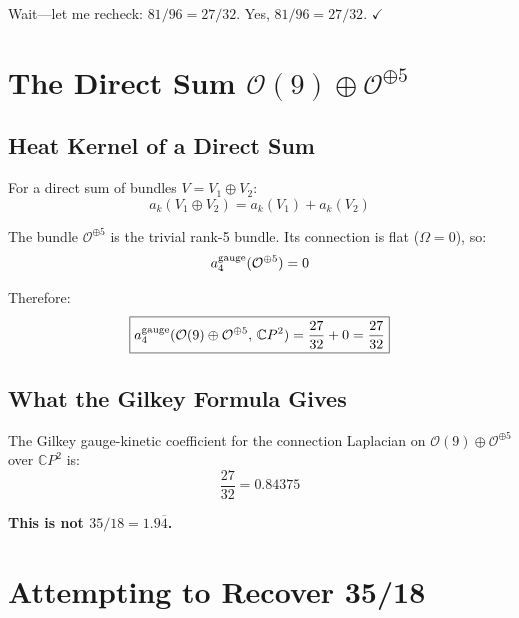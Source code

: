 \documentclass[12pt,a4paper]{article}
\theoremstyle{definition}
\begin{document}
Wait---let me recheck: $81/96 = 27/32$.  Yes, $81/96 = 27/32$. $\checkmark$

\section{The Direct Sum $\mathcal{O}(9) \oplus \mathcal{O}^{\oplus 5}$}
\label{sec:direct-sum}

\subsection{Heat Kernel of a Direct Sum}

For a direct sum of bundles $V = V_1 \oplus V_2$:
\begin{equation}
a_k(V_1 \oplus V_2) = a_k(V_1) + a_k(V_2)
\end{equation}

The bundle $\mathcal{O}^{\oplus 5}$ is the trivial rank-5 bundle.
Its connection is flat ($\Omega = 0$), so:
\begin{equation}
a_4^{\rm gauge}(\mathcal{O}^{\oplus 5}) = 0
\end{equation}

Therefore:
\begin{equation}
\boxed{
a_4^{\rm gauge}(\mathcal{O}(9) \oplus \mathcal{O}^{\oplus 5},\,\mathbb{C}P^2)
= \frac{27}{32} + 0 = \frac{27}{32}
}
\end{equation}

\subsection{What the Gilkey Formula Gives}

The Gilkey gauge-kinetic coefficient for the connection Laplacian on
$\mathcal{O}(9) \oplus \mathcal{O}^{\oplus 5}$ over $\mathbb{C}P^2$ is:
\begin{equation}
\frac{27}{32} = 0.84375
\end{equation}

\textbf{This is not $35/18 = 1.9\overline{4}$.}

\section{Attempting to Recover 35/18}
\label{sec:attempt}
\end{document}
